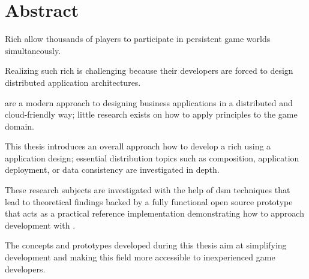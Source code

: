 \section*{Abstract}

Rich \ogs{} allow thousands of players to participate in persistent game worlds
simultaneously. 


Realizing such rich \ogs{} is challenging because their developers are forced
to design distributed application architectures.

\mssuc{} are a modern approach to designing business applications in a
distributed and cloud-friendly way; little research exists on how to apply \ms{}
principles to the game domain.

This thesis introduces an overall approach how to develop a rich \og{} using a
\ms{} application design; essential distribution topics such as \ms{}
composition, application deployment, or data consistency are investigated in
depth.

These research subjects are investigated with the help of \gls{dsm}
techniques that lead to theoretical findings backed by a fully
functional open source prototype that acts as a practical reference
implementation demonstrating how to approach \og{} development with \mss{}.

The concepts and prototypes developed during this thesis aim at simplifying
\og{} development and making this field more accessible to inexperienced game
developers.
